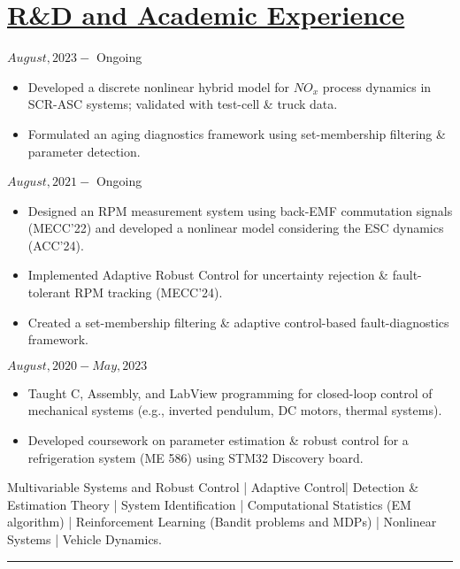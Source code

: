 \section*{\underline{R\&D and Academic Experience}}
\noindent {} \hfill $August, 2023 - $ Ongoing
\begin{itemize}
        \item Developed a discrete nonlinear hybrid model for $NO_x$ process dynamics in SCR-ASC systems; validated with test-cell \& truck data.
        \item Formulated an aging diagnostics framework using set-membership filtering \& parameter detection.
\end{itemize}

\medskip

\noindent {} \hfill $August, 2021 - $ Ongoing
\begin{itemize}
        \item Designed an RPM measurement system using back-EMF commutation signals (MECC'22) and developed a nonlinear model considering the ESC dynamics (ACC'24).
        \item Implemented Adaptive Robust Control for uncertainty rejection \& fault-tolerant RPM tracking (MECC'24).
        \item Created a set-membership filtering \& adaptive control-based fault-diagnostics framework.
\end{itemize}

\medskip

\noindent {} \hfill $August, 2020 - May, 2023$
\begin{itemize}
        \item Taught C, Assembly, and LabView programming for closed-loop control of mechanical systems (e.g., inverted pendulum, DC motors, thermal systems).

        \item {} Developed coursework on parameter estimation \& robust control for a refrigeration system (ME 586) using STM32 Discovery board.
\end{itemize}
\medskip
 Multivariable Systems and Robust Control |
                        Adaptive Control|
                        Detection \& Estimation Theory |
                        System Identification |
                        Computational Statistics (EM algorithm) |
                        Reinforcement Learning (Bandit problems and MDPs) |
                        Nonlinear Systems | Vehicle Dynamics.


\noindent\rule{\textwidth}{0.4pt}
